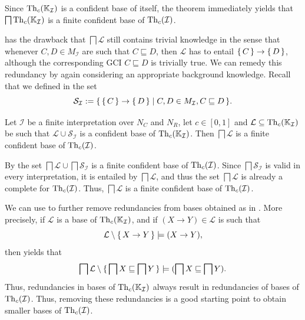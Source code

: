 Since $\operatorname{Th}_c({\mathbb{K}}_{\mathcal{I}})$ is a confident base of itself, the theorem immediately
yields that $\bigsqcap \operatorname{Th}_c({\mathbb{K}}_{\mathcal{I}})$ is a finite confident base of
$\operatorname{Th}_c(\mathcal{I})$.

 has the drawback
that $\bigsqcap \mathcal{L}$ still contains trivial knowledge in the sense that whenever
$C, D \in M_{\mathcal{I}}$ are such that $C \sqsubseteq D$, then $\mathcal{L}$ has to
entail ${\{\, C \,\}} \to {\ensuremath{\{\, D \,\}}}$, although the corresponding GCI $C \sqsubseteq D$ is
trivially true.  We can remedy this redundancy by again considering an appropriate
background knowledge.  Recall that we defined in  the set
\begin{equation*}
  \mathcal{S}_{\mathcal{I}} := {\{\, {\{\, C \,\}} \to {\ensuremath{\{\, D \,\}}} \mid C, D \in
    M_{\mathcal{I}}, C \sqsubseteq D \,\}}.
\end{equation*}

\begin{Corollary}
  \label{cor:using-background-knowledge-for-confident-bases}
  Let $\mathcal{I}$ be a finite interpretation over $N_C$ and $N_R$, let $c \in [0,1]$ and
  $\mathcal{L} \subseteq \operatorname{Th}_c({\mathbb{K}}_{\mathcal{I}})$ be such that $\mathcal{L} \cup
  \mathcal{S}_{\mathcal{I}}$ is a confident base of $\operatorname{Th}_c({\mathbb{K}}_{\mathcal{I}})$.  Then
  $\bigsqcap \mathcal{L}$ is a finite confident base of $\operatorname{Th}_c(\mathcal{I})$.
\end{Corollary}
\begin{Proof}
  By  the set
  $\bigsqcap \mathcal{L} \cup \bigsqcap \mathcal{S}_{\mathcal{I}}$ is a finite confident
  base of $\operatorname{Th}_c(\mathcal{I})$.  Since $\bigsqcap \mathcal{S}_{\mathcal{I}}$ is valid in
  every interpretation, it is entailed by $\bigsqcap \mathcal{L}$, and thus the set
  $\bigsqcap \mathcal{L}$ is already a complete for $\operatorname{Th}_c(\mathcal{I})$.  Thus,
  $\bigsqcap \mathcal{L}$ is a finite confident base of $\operatorname{Th}_c(\mathcal{I})$.
\end{Proof}

We can use  to further remove
redundancies from bases obtained as in
.  More precisely,
if $\mathcal{L}$ is a base of $\operatorname{Th}_c({\mathbb{K}}_{\mathcal{I}})$, and if $(X \to Y) \in
\mathcal{L}$ is such that
\begin{equation*}
  \mathcal{L} \setminus {\ensuremath{\{\, X \to Y \,\}}} \models (X \to Y),
\end{equation*}
then  yields that
\begin{equation*}
  \bigsqcap \mathcal{L} \setminus {\ensuremath{\{\, \bigsqcap X \sqsubseteq \bigsqcap Y \,\}}} \models (
  \bigsqcap X \sqsubseteq \bigsqcap Y).
\end{equation*}
Thus, redundancies in bases of $\operatorname{Th}_c({\mathbb{K}}_{\mathcal{I}})$ always result in redundancies
of bases of $\operatorname{Th}_c(\mathcal{I})$.  Thus, removing these redundancies is a good starting
point to obtain smaller bases of $\operatorname{Th}_c(\mathcal{I})$.

